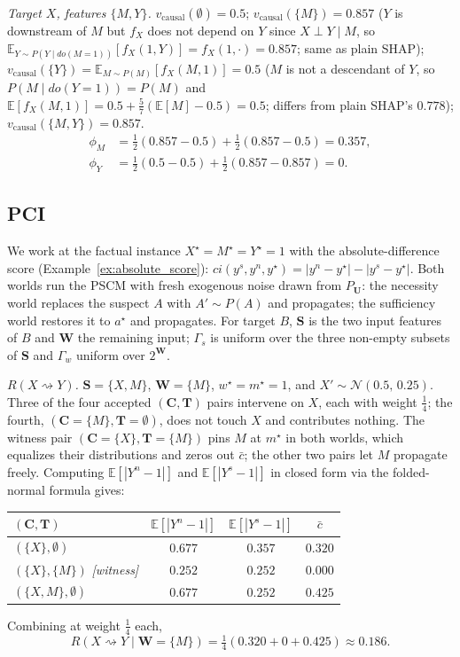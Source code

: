 \textit{Target $X$, features $\{M,Y\}$.}
$v_{\mathrm{causal}}(\emptyset)=0.5$;\enspace
$v_{\mathrm{causal}}(\{M\})=0.857$ ($Y$ is downstream of $M$ but $f_X$
does not depend on $Y$ since $X\perp Y\mid M$, so
$\mathbb{E}_{Y\sim P(Y\mid do(M{=}1))}[f_X(1,Y)]=f_X(1,\cdot)=0.857$;
same as plain SHAP);\enspace
$v_{\mathrm{causal}}(\{Y\})=\mathbb{E}_{M\sim P(M)}[f_X(M,1)]=0.5$
($M$ is not a descendant of $Y$, so $P(M\mid do(Y{=}1))=P(M)$
and $\mathbb{E}[f_X(M,1)]=0.5+\tfrac{5}{7}(\mathbb{E}[M]-0.5)=0.5$;
differs from plain SHAP's $0.778$);\enspace
$v_{\mathrm{causal}}(\{M,Y\})=0.857$.
\begin{align}
\phi_M &= \tfrac{1}{2}(0.857-0.5)+\tfrac{1}{2}(0.857-0.5)=0.357, \\
\phi_Y &= \tfrac{1}{2}(0.5-0.5)+\tfrac{1}{2}(0.857-0.857)=0.
\end{align}

\subsection{PCI}\label{app:signal_pci}

We work at the factual instance $X^\star = M^\star = Y^\star = 1$ with the
absolute-difference score (Example~\ref{ex:absolute_score}):
$ci(y^s, y^n, y^\star) = |y^n - y^\star| - |y^s - y^\star|$. Both worlds run
the PSCM with fresh exogenous noise drawn from $P_{\mathbf{U}}$: the necessity
world replaces the suspect $A$ with $A' \sim P(A)$ and propagates; the
sufficiency world restores it to $a^\star$ and propagates. For target $B$,
$\mathbf{S}$ is the two input features of $B$ and $\mathbf{W}$ the remaining
input; $\Gamma_s$ is uniform over the three non-empty subsets of $\mathbf{S}$
and $\Gamma_w$ uniform over $2^{\mathbf{W}}$.

\textit{$R(X \rightsquigarrow Y)$.}
$\mathbf{S} = \{X, M\}$, $\mathbf{W} = \{M\}$, $w^\star = m^\star = 1$, and
$X' \sim \mathcal{N}(0.5,\, 0.25)$. Three of the four accepted
$(\mathbf{C}, \mathbf{T})$ pairs intervene on $X$, each with weight
$\tfrac{1}{4}$; the fourth, $(\mathbf{C}{=}\{M\}, \mathbf{T}{=}\emptyset)$,
does not touch $X$ and contributes nothing. The
witness pair $(\mathbf{C}{=}\{X\}, \mathbf{T}{=}\{M\})$ pins $M$ at $m^\star$
in both worlds, which equalizes their distributions and zeros out $\bar c$;
the other two pairs let $M$ propagate freely. Computing
$\mathbb{E}[|Y^n - 1|]$ and $\mathbb{E}[|Y^s - 1|]$ in closed form via the
folded-normal formula gives:
\begin{center}
\begin{tabular}{lccc}
\toprule
$(\mathbf{C}, \mathbf{T})$ & $\mathbb{E}[|Y^n - 1|]$ & $\mathbb{E}[|Y^s - 1|]$ & $\bar c$ \\
\midrule
$(\{X\}, \emptyset)$              & $0.677$ & $0.357$ & $0.320$ \\
$(\{X\}, \{M\})$ \emph{[witness]} & $0.252$ & $0.252$ & $0.000$ \\
$(\{X, M\}, \emptyset)$           & $0.677$ & $0.252$ & $0.425$ \\
\bottomrule
\end{tabular}
\end{center}
Combining at weight $\tfrac{1}{4}$ each,
\[
R(X \rightsquigarrow Y \mid \mathbf{W}{=}\{M\})
= \tfrac{1}{4}(0.320 + 0 + 0.425) \approx 0.186.
\]

